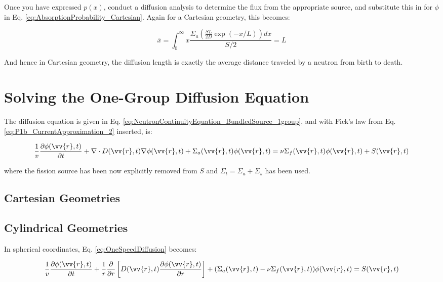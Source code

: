 \documentclass[10pt]{article}
\begin{document}
\begin{flushleft}
Once you have expressed \(p(x)\), conduct a diffusion analysis to determine the flux from the appropriate source, and substitute this in for \(\phi\) in Eq. \ref{eq:AbsorptionProbability_Cartesian}. Again for a Cartesian geometry, this becomes:

\begin{equation}
\label{AverageDistance_Cartesian}
\bar{x}=\int_{0}^{\infty}x\frac{\Sigma_a\left(\frac{SL}{2D}\exp(-x/L)\right)dx}{S/2}=L
\end{equation}

And hence in Cartesian geometry, the diffusion length is exactly the average distance traveled by a neutron from birth to death.


\section{Solving the One-Group Diffusion Equation}

The diffusion equation is given in Eq. \eqref{eq:NeutronContinuityEquation_BundledSource_1group}, and with Fick's law from Eq. \eqref{eq:P1b_CurrentApproximation_2} inserted, is:

\begin{equation}
\label{eq:OneSpeedDiffusion}
\frac{1}{v} \frac{\partial\phi(\vv{r}, t)}{\partial t} +\nabla\cdot D(\vv{r}, t)\nabla\phi(\vv{r},t) + \Sigma_a(\vv{r},t)\phi(\vv{r}, t) = \nu\Sigma_f(\vv{r},t)\phi(\vv{r},t)+ S(\vv{r}, t)
\end{equation}

where the fission source has been now explicitly removed from \(S\) and \(\Sigma_t=\Sigma_a+\Sigma_s\) has been used. 

\subsection{Cartesian Geometries}

\subsection{Cylindrical Geometries}

In spherical coordinates, Eq. \eqref{eq:OneSpeedDiffusion} becomes:

\begin{equation}
\label{eq:OneSpeedDiffusionCylindrical}
\frac{1}{v} \frac{\partial\phi(\vv{r}, t)}{\partial t} +\frac{1}{r}\frac{\partial}{\partial r}\left\lbrack D(\vv{r},t)\frac{\partial\phi(\vv{r},t)}{\partial r}\right\rbrack + (\Sigma_a(\vv{r},t)-\nu\Sigma_f(\vv{r},t))\phi(\vv{r}, t) = S(\vv{r}, t)
\end{equation}


\end{flushleft}
\end{document}
